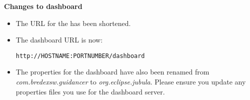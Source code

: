 \textbf{Changes to dashboard}
\begin{itemize}
\item The URL for the \dash{} has been shortened. 
\item The dashboard URL is now:
\begin{verbatim}
http://HOSTNAME:PORTNUMBER/dashboard
\end{verbatim}
\item The properties for the dashboard have also been renamed from \textit{com.bredexsw.guidancer} to \textit{org.eclipse.jubula}. Please ensure you update any properties files you use for the dashboard server.
\end{itemize}
